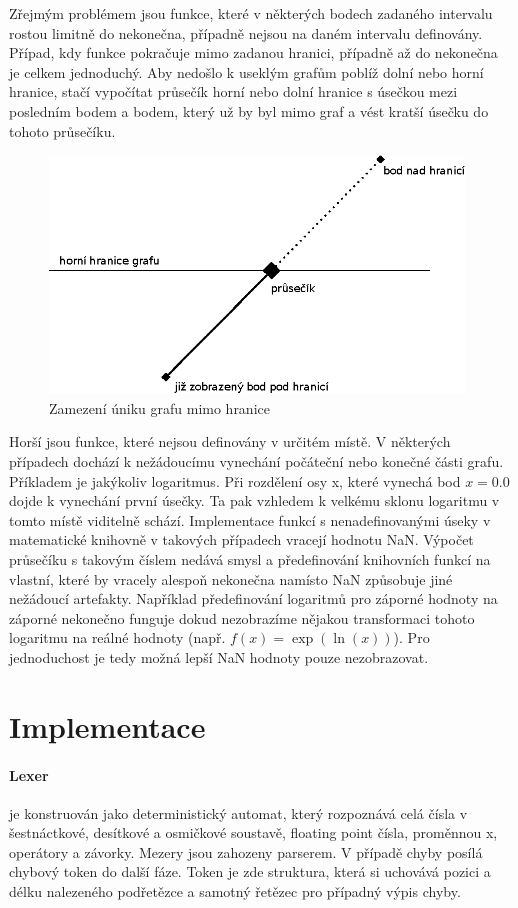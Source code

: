 \documentclass[11pt]{article}
\begin{document}
\clearpage
Zřejmým problémem jsou funkce, které v některých bodech zadaného intervalu
rostou limitně do nekonečna, případně nejsou na daném intervalu definovány.
Případ, kdy funkce pokračuje mimo zadanou hranici, případně až do nekonečna je
celkem jednoduchý. Aby nedošlo k useklým grafům poblíž dolní nebo horní
hranice, stačí vypočítat průsečík horní nebo dolní hranice s úsečkou mezi
posledním bodem a bodem, který už by byl mimo graf a vést kratší úsečku do
tohoto průsečíku. 
\begin{figure}[ht!]
\centering
	\includegraphics[width=11cm]{figures/boundary.eps}
	\caption{Zamezení úniku grafu mimo hranice}
\end{figure}

Horší jsou funkce, které nejsou definovány v určitém místě. V některých
případech dochází k nežádoucímu vynechání počáteční nebo konečné části grafu.
Příkladem je jakýkoliv logaritmus. Při rozdělení osy x, které vynechá bod $x =
0.0$ dojde k vynechání první úsečky. Ta pak vzhledem k velkému sklonu logaritmu
v tomto místě viditelně schází. Implementace funkcí s nenadefinovanými úseky v
matematické knihovně v takových případech vracejí hodnotu NaN. Výpočet
průsečíku s takovým číslem nedává smysl a předefinování knihovních funkcí na
vlastní, které by vracely alespoň nekonečna namísto NaN způsobuje jiné
nežádoucí artefakty. Například předefinování logaritmů pro záporné hodnoty na
záporné nekonečno funguje dokud nezobrazíme nějakou transformaci tohoto
logaritmu na reálné hodnoty (např. $f(x) = \exp(\ln(x))$). Pro jednoduchost je
tedy možná lepší NaN hodnoty pouze nezobrazovat.


\section{Implementace}
\paragraph{Lexer} 
je konstruován jako deterministický automat, který rozpoznává celá čísla v
šestnáctkové, desítkové a osmičkové soustavě, floating point čísla, proměnnou
x, operátory a závorky. Mezery jsou zahozeny parserem. V případě chyby posílá
chybový token do další fáze.  Token je zde struktura, která si uchovává pozici
a délku nalezeného podřetězce a samotný řetězec pro případný výpis chyby.
\end{document}
